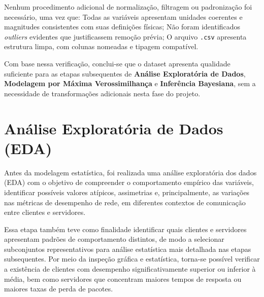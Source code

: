 \documentclass{article}
\begin{document}
Nenhum procedimento adicional de normalização, filtragem ou padronização foi
necessário, uma vez que: Todas as variáveis apresentam unidades coerentes e magnitudes consistentes com suas definições físicas; Não foram identificados \textit{outliers} evidentes que justificassem remoção prévia; O arquivo \texttt{.csv} apresenta estrutura limpa, com colunas nomeadas e tipagem compatível.

Com base nessa verificação, conclui-se que o dataset apresenta qualidade suficiente
para as etapas subsequentes de \textbf{Análise Exploratória de Dados}, \textbf{Modelagem por Máxima Verossimilhança}
e \textbf{Inferência Bayesiana}, sem a necessidade de transformações adicionais nesta fase do projeto.



\section{Análise Exploratória de Dados (EDA)}

Antes da modelagem estatística, foi realizada uma análise exploratória dos dados (EDA)
com o objetivo de compreender o comportamento empírico das variáveis,
identificar possíveis valores atípicos, assimetrias e, principalmente, as variações
nas métricas de desempenho de rede, em diferentes contextos de comunicação entre clientes e servidores.

Essa etapa também teve como finalidade identificar quais clientes e servidores
apresentam padrões de comportamento distintos, de modo a selecionar subconjuntos
representativos para análise estatística mais detalhada nas etapas subsequentes.
Por meio da inspeção gráfica e estatística, torna-se possível verificar a existência de
clientes com desempenho significativamente superior ou inferior à média, bem como
servidores que concentram maiores tempos de resposta ou maiores taxas de perda de pacotes.
\end{document}
